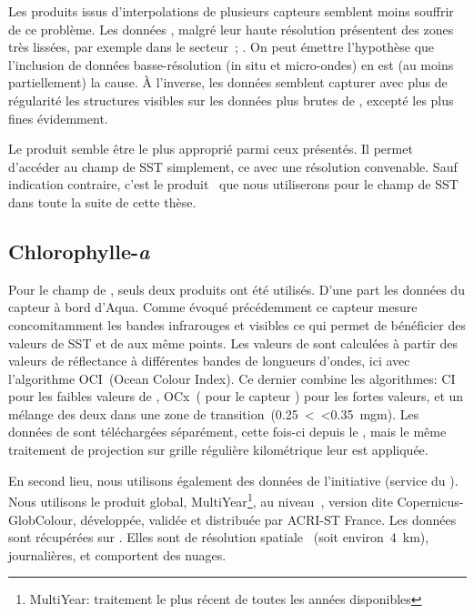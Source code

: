 Les produits issus d'interpolations de plusieurs capteurs semblent moins souffrir de ce problème.
Les données , malgré leur haute résolution présentent des zones très lissées, par exemple dans le secteur~; .
On peut émettre l'hypothèse que l'inclusion de données basse-résolution (in situ et micro-ondes) en est (au moins partiellement) la cause.
À l'inverse, les données  semblent capturer avec plus de régularité les structures visibles sur les données plus brutes de , excepté les plus fines évidemment.

Le produit  semble être le plus approprié parmi ceux présentés.
Il permet d'accéder au champ de SST simplement, ce avec une résolution convenable.
Sauf indication contraire, c'est le produit~ que nous utiliserons pour le champ de SST dans toute la suite de cette thèse.

\subsection{Chlorophylle-\textit{a}}
\label{sec:donnees-chl}

Pour le champ de , seuls deux produits ont été utilisés.
D'une part les données du capteur  à bord d'Aqua.
Comme évoqué précédemment ce capteur mesure concomitamment les bandes infrarouges et visibles ce qui permet de bénéficier des valeurs de SST et de  aux même points.
Les valeurs de  sont calculées à partir des valeurs de réflectance à différentes bandes de longueurs d'ondes, ici avec l'algorithme OCI~(Ocean Colour Index).
Ce dernier combine les algorithmes: CI pour les faibles valeurs de , OCx~(  pour le capteur ) pour les fortes valeurs, et un mélange des deux dans une zone de transition~(0.25~\textless {}~\textless 0.35~\unit{mgm}).
Les données de  sont téléchargées séparément, cette fois-ci depuis le , mais le même traitement de projection sur grille régulière kilométrique leur est appliquée.

En second lieu, nous utilisons également des données de l'initiative  (service du ).
Nous utilisons le produit global, MultiYear\footnote{%
  MultiYear: traitement le plus récent de toutes les années disponibles
}, au niveau~, version dite Copernicus-GlobColour, développée, validée et distribuée par ACRI-ST France.
Les données sont récupérées sur .
Elles sont de résolution spatiale~ (soit environ~\qty{4}{\km}), journalières, et comportent des nuages.

